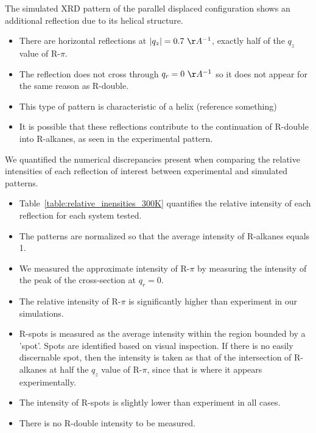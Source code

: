\documentclass{article}
\begin{document}
  The simulated XRD pattern of the parallel displaced configuration shows an additional
  reflection due to its helical structure. 
  \begin{itemize}
  		\item There are horizontal reflections at $|q_z|= 0.7~\AA^{-1}$, exactly half of 
  		the $q_z$ value of R-$\pi$. 
  		\item The reflection does not cross through $q_r = 0~\AA^{-1}$ so it does not
  		appear for the same reason as R-double. 
  		\item This type of pattern is characteristic of a helix (reference something)
  		\item It is possible that these reflections contribute to the continuation of
  		R-double into R-alkanes, as seen in the experimental pattern. 
  \end{itemize}
  
  We quantified the numerical discrepancies present when comparing the relative intensities
  of each reflection of interest between experimental and simulated patterns. 
  \begin{itemize}
  		\item Table~\ref{table:relative_inensities_300K} quantifies the relative intensity
  		of each reflection for each system tested.
  		\item The patterns are normalized so that the average intensity of R-alkanes equals 1. 
  		\item We measured the approximate intensity of R-$\pi$ by measuring the intensity of 
  		the peak of the cross-section at $q_r=0$. 
  		\item The relative intensity of R-$\pi$ is significantly higher than experiment in our
  		simulations.
  		\item R-spots is measured as the average intensity within the region bounded by a 'spot'.
  		Spots are identified based on visual inspection. If there is no easily discernable spot,
  		then the intensity is taken as that of the intersection of R-alkanes at half the $q_z$
  		value of R-$\pi$, since that is where it appears experimentally. 
  		\item The intensity of R-spots is slightly lower than experiment in all cases.
  		\item There is no R-double intensity to be measured.
  \end{itemize} 
\end{document}
